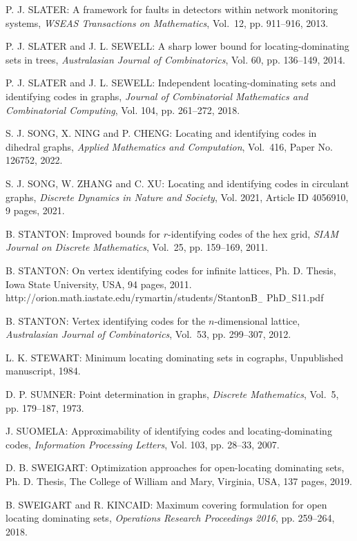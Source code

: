 \begin{thebibliography}{999}
P. J. SLATER: A framework for faults in detectors within network monitoring systems, {\it WSEAS Transactions on Mathematics}, Vol.~12, pp. 911--916, 2013.

P. J. SLATER and J. L. SEWELL: A sharp lower bound for locating-dominating sets in trees, {\it Australasian Journal of Combinatorics}, Vol. 60, pp. 136--149, 2014.

P. J. SLATER and J. L. SEWELL: Independent locating-dominating sets and identifying codes in graphs, {\it Journal of Combinatorial Mathematics and Combinatorial Computing}, Vol. 104, pp. 261--272, 2018.

S. J. SONG, X. NING and P. CHENG: Locating and identifying codes in dihedral graphs, {\it Applied Mathematics and Computation}, Vol.~416, Paper No. 126752, 2022.

S. J. SONG, W. ZHANG and C. XU: Locating and identifying codes in circulant graphs, {\it Discrete Dynamics in Nature and Society}, Vol. 2021, Article ID 4056910, 9 pages, 2021.

B. STANTON: Improved bounds for $r$-identifying codes of the hex grid, {\it SIAM Journal on Discrete Mathematics}, Vol.~25, pp. 159--169, 2011.

B. STANTON: On vertex identifying codes for infinite lattices, Ph. D. Thesis, Iowa State University, USA, 94 pages, 2011.\\
http://orion.math.iastate.edu/rymartin/students/StantonB$_{-}$ PhD$_{-}$S11.pdf

B. STANTON: Vertex identifying codes for the $n$-dimensional lattice, {\it Australasian Journal of Combinatorics}, Vol.~53, pp. 299--307, 2012.

L. K. STEWART: Minimum locating dominating sets in cographs, Unpublished manuscript, 1984.

 D. P. SUMNER: Point determination in graphs, {\it Discrete Mathematics}, Vol.~5, pp. 179--187, 1973.

J. SUOMELA: Approximability of identifying codes and locating-dominating codes, {\it Information Processing Letters}, Vol. 103, pp. 28--33, 2007.

D. B. SWEIGART:  Optimization approaches for open-locating dominating sets, Ph. D. Thesis, The College of William and Mary, Virginia, USA, 137 pages, 2019.

B. SWEIGART and R. KINCAID: Maximum covering formulation for open locating dominating sets, {\it Operations Research Proceedings 2016}, pp. 259--264, 2018.


\end{thebibliography}

